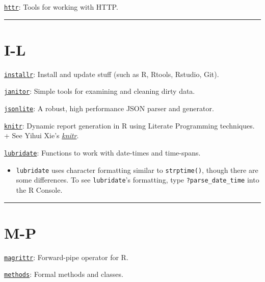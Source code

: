 \documentclass[]{book}
\providecommand{\tightlist}{%
  \setlength{\itemsep}{0pt}\setlength{\parskip}{0pt}}
\begin{document}
\href{https://CRAN.R-project.org/package=httr}{\texttt{httr}}: Tools for working with HTTP.

\begin{center}\rule{0.5\linewidth}{\linethickness}\end{center}

\hypertarget{i-l}{%
\section{I-L}\label{i-l}}

\href{https://CRAN.R-project.org/package=installr}{\texttt{installr}}: Install and update stuff (such as R, Rtools, Rstudio, Git).

\href{https://CRAN.R-project.org/package=janitor}{\texttt{janitor}}: Simple tools for examining and cleaning dirty data.

\href{https://CRAN.R-project.org/package=jsonlite}{\texttt{jsonlite}}: A robust, high performance JSON parser and generator.

\href{https://CRAN.R-project.org/package=knitr}{\texttt{knitr}}: Dynamic report generation in R using Literate Programming techniques.
+ See Yihui Xie's \href{http://yihui.name/knitr/}{\emph{knitr}}.

\href{https://CRAN.R-project.org/package=lubridate}{\texttt{lubridate}}: Functions to work with date-times and time-spans.

\begin{itemize}
\tightlist
\item
  \texttt{lubridate} uses character formatting similar to \texttt{strptime()}, though there are some differences. To see \texttt{lubridate}'s formatting, type \texttt{?parse\_date\_time} into the R Console.
\end{itemize}

\begin{center}\rule{0.5\linewidth}{\linethickness}\end{center}

\hypertarget{m-p}{%
\section{M-P}\label{m-p}}

\href{https://CRAN.R-project.org/package=magrittr}{\texttt{magrittr}}: Forward-pipe operator for R.

\href{https://www.rdocumentation.org/packages/methods/versions/3.5.1}{\texttt{methods}}: Formal methods and classes.
\end{document}
